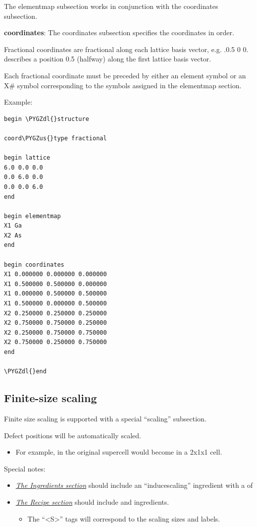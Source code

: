 \documentclass[letterpaper,10pt,english]{sphinxmanual}
\def\PYGZus{\char`\_}
\def\PYGZdl{\char`\$}
\begin{document}
The elementmap subsection works in conjunction with the coordinates subsection.

\textbf{coordinates}: The coordinates subsection specifies the coordinates in order.

Fractional coordinates are fractional along each lattice basis vector, e.g. .0.5 0 0. describes a position 0.5 (halfway) along the first lattice basis vector.

Each fractional coordinate must be preceded by either an element symbol or an X\# symbol corresponding to the symbols assigned in the elementmap section.

Example:

\begin{Verbatim}[commandchars=\\\{\}]
begin \PYGZdl{}structure

coord\PYGZus{}type fractional

begin lattice
6.0 0.0 0.0
0.0 6.0 0.0
0.0 0.0 6.0
end

begin elementmap
X1 Ga
X2 As
end

begin coordinates
X1 0.000000 0.000000 0.000000
X1 0.500000 0.500000 0.000000
X1 0.000000 0.500000 0.500000
X1 0.500000 0.000000 0.500000
X2 0.250000 0.250000 0.250000
X2 0.750000 0.750000 0.250000
X2 0.250000 0.750000 0.750000
X2 0.750000 0.250000 0.750000
end

\PYGZdl{}end
\end{Verbatim}


\subsection{Finite-size scaling}
\label{3_1_1_structure:finite-size-scaling}
Finite size scaling is supported with a special ``scaling'' subsection.

Defect positions will be automatically scaled.
\begin{itemize}
\item {} 
For example,  in the original supercell would become  in a 2x1x1 cell.

\end{itemize}

Special notes:
\begin{itemize}
\item {} 
{\hyperref[3_1_2_ingredients::doc]{\emph{The Ingredients section}}} should include an ``inducescaling'' ingredient with a  of 

\item {} 
{\hyperref[3_1_3_recipe::doc]{\emph{The Recipe section}}} should include  and  ingredients.
\begin{itemize}
\item {} 
The ``\textless{}S\textgreater{}'' tags will correspond to the scaling sizes and labels.

\end{itemize}

\end{itemize}
\end{document}
